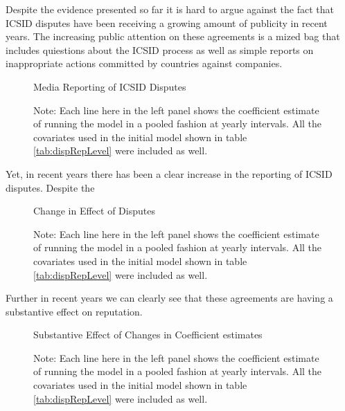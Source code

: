 \documentclass[12pt,onesided]{amsart}
\begin{document}
Despite the evidence presented so far it is hard to argue against the fact that ICSID disputes have been receiving a growing amount of publicity in recent years. The increasing public attention on these agreements is a mized bag that includes quiestions about the ICSID process as well as simple reports on inappropriate actions committed by countries against companies. 

\begin{figure}[ht]
	\vspace{4cm}
	\centering
	\caption{Media Reporting of ICSID Disputes}
	\label{fig:levelCross}
	\resizebox{1\textwidth}{!}{}
	\caption*{Note: Each line here in the left panel shows the coefficient estimate of running the model in a pooled fashion at yearly intervals. All the covariates used in the initial model shown in table \ref{tab:dispRepLevel} were included as well.}
\end{figure}

Yet, in recent years there has been a clear increase in the reporting of ICSID disputes. Despite the 

\begin{figure}[ht]
	\vspace{4cm}
	\centering
	\caption{Change in Effect of Disputes}
	\label{fig:levelCross}
	\resizebox{1\textwidth}{!}{}
	\caption*{Note: Each line here in the left panel shows the coefficient estimate of running the model in a pooled fashion at yearly intervals. All the covariates used in the initial model shown in table \ref{tab:dispRepLevel} were included as well.}
\end{figure}


Further in recent years we can clearly see that these agreements are having a substantive effect on reputation.

\begin{figure}[ht]
	\vspace{4cm}
	\centering
	\caption{Substantive Effect of Changes in Coefficient estimates}
	\label{fig:levelCross}
	\resizebox{1\textwidth}{!}{}
	\caption*{Note: Each line here in the left panel shows the coefficient estimate of running the model in a pooled fashion at yearly intervals. All the covariates used in the initial model shown in table \ref{tab:dispRepLevel} were included as well.}
\end{figure}
\end{document}
